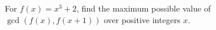 For $f(x)=x^3+2$, find the maximum possible value of $\gcd(f(x),f(x+1))$ over positive integers $x$.
